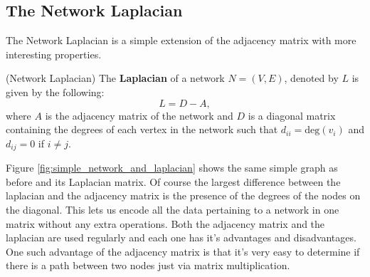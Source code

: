 \subsection{The Network Laplacian}
The Network Laplacian is a simple extension of the adjacency matrix with more interesting properties.

\begin{definition}{(Network Laplacian)}
    The \textbf{Laplacian} of a network $N = (V, E)$, denoted by $L$ is given by the following:
    $$ L = D - A, $$
    where $A$ is the adjacency matrix of the network and $D$ is a diagonal matrix containing the degrees of each vertex in the network such that $d_{ii} = \text{deg}(v_i)$ and $d_{ij} = 0$ if $i \not= j$.
\end{definition}

Figure \ref{fig:simple_network_and_laplacian} shows the same simple graph as before and its Laplacian matrix. Of course the largest difference between the laplacian and the adjacency matrix is the presence of the degrees of the nodes on the diagonal. This lets us encode all the data pertaining to a network in one matrix without any extra operations. Both the adjacency matrix and the laplacian are used regularly and each one has it's advantages and disadvantages. One such advantage of the adjacency matrix is that it's very easy to determine if there is a path between two nodes just via matrix multiplication.

